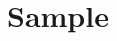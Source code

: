 \documentclass[a4paper,11pt]{report}
\title{}
\begin{document}

\chapter{Sample}
    
\end{document}
